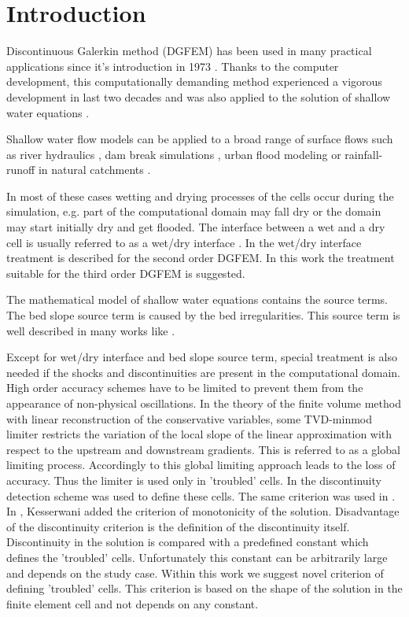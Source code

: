 \section{Introduction}


Discontinuous Galerkin method (DGFEM) has been used in many practical applications since it's introduction in 1973 \cite{reed1973}. Thanks to the computer development, this computationally demanding method experienced a vigorous development in last two decades and was also applied to the solution of shallow water equations \cite{kesserwani2015,Vater20151,Ambati2007452,ref1,JAFFRE1995}.

 Shallow water flow models can be applied to a broad range of surface flows such as river hydraulics \cite{kesserwani2015,Liang2015b} , dam break simulations \cite{George2011, Song2011a, 
Lacasta2014}, urban flood modeling \cite{Liang2010, Smith2013, Guinot2012} or
rainfall-runoff in natural catchments \cite{Simons2014, Mugler2011, 
Viero2014}.

In most of these cases wetting and drying processes of the cells occur during 
the simulation, e.g. part of the computational domain may fall dry or the 
domain may start initially dry and get flooded. The 
interface between a wet and a dry cell is usually referred to as a wet/dry interface \cite{Bollermann2013,Beisiegel2015}.  In \cite{Vater20151} the wet/dry interface treatment is described for the second order DGFEM. In this work the treatment suitable for the third order DGFEM is suggested.

The mathematical model of shallow water equations contains the source terms. The bed slope source term is caused by the bed irregularities. This source term is well described in many works like \cite{Ambati2007452,Ambati20071233,kesserwani2015,Beisiegel2015,Tassi2007998}. 

Except for wet/dry interface and bed slope source term, special treatment is also needed if the shocks and discontinuities are present in the computational domain. High order accuracy schemes have to be limited to prevent them from the appearance of non-physical oscillations. In the theory of the finite volume method with linear reconstruction of the conservative variables, some TVD-minmod limiter restricts the variation of the local slope of the linear approximation with respect to the upstream and downstream gradients. This is referred to as a global limiting process. Accordingly to \cite{krivodonova2004,shu2005} this global limiting approach leads to the loss of accuracy. Thus the limiter is used only in 'troubled' cells. In \cite{krivodonova2004} the discontinuity detection scheme was used to define these cells. The same criterion was used in \cite{Ambati2007452}. In \cite{kesserwani2015}, Kesserwani added the criterion of monotonicity of the solution. Disadvantage of the discontinuity criterion is the definition of the discontinuity itself. Discontinuity in the solution is compared with a predefined constant which defines the 'troubled' cells. Unfortunately this constant can be arbitrarily large and depends on the study case.  Within this work we suggest novel criterion of defining 'troubled' cells. This criterion is based on the shape of the solution in the finite element cell and not depends on any constant. 

